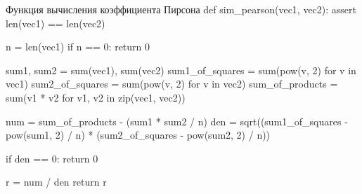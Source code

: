 \begin{pylst}{Функция вычисления коэффициента Пирсона}{}
def sim_pearson(vec1, vec2):
    assert len(vec1) == len(vec2)

    n = len(vec1)
    if n == 0:
        return 0

    sum1, sum2 = sum(vec1), sum(vec2)
    sum1_of_squares = sum(pow(v, 2) for v in vec1)
    sum2_of_squares = sum(pow(v, 2) for v in vec2)
    sum_of_products = sum(v1 * v2 for v1, v2 in zip(vec1, vec2))

    num = sum_of_products - (sum1 * sum2 / n)
    den = sqrt((sum1_of_squares - pow(sum1, 2) / n) *
               (sum2_of_squares - pow(sum2, 2) / n))

    if den == 0:
        return 0

    r = num / den
    return r
\end{pylst}
